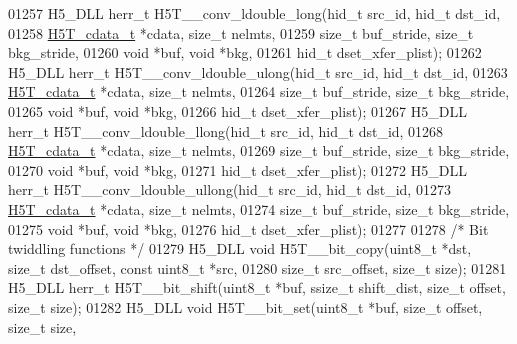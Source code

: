 \begin{DoxyCode}
01257 H5\_DLL herr\_t H5T\_\_conv\_ldouble\_long(hid\_t src\_id, hid\_t dst\_id,
01258                      \hyperlink{struct_h5_t__cdata__t}{H5T\_cdata\_t} *cdata, \textcolor{keywordtype}{size\_t} nelmts,
01259                      \textcolor{keywordtype}{size\_t} buf\_stride, \textcolor{keywordtype}{size\_t} bkg\_stride,
01260                                      \textcolor{keywordtype}{void} *buf, \textcolor{keywordtype}{void} *bkg,
01261                                      hid\_t dset\_xfer\_plist);
01262 H5\_DLL herr\_t H5T\_\_conv\_ldouble\_ulong(hid\_t src\_id, hid\_t dst\_id,
01263                      \hyperlink{struct_h5_t__cdata__t}{H5T\_cdata\_t} *cdata, \textcolor{keywordtype}{size\_t} nelmts,
01264                      \textcolor{keywordtype}{size\_t} buf\_stride, \textcolor{keywordtype}{size\_t} bkg\_stride,
01265                                      \textcolor{keywordtype}{void} *buf, \textcolor{keywordtype}{void} *bkg,
01266                                      hid\_t dset\_xfer\_plist);
01267 H5\_DLL herr\_t H5T\_\_conv\_ldouble\_llong(hid\_t src\_id, hid\_t dst\_id,
01268                      \hyperlink{struct_h5_t__cdata__t}{H5T\_cdata\_t} *cdata, \textcolor{keywordtype}{size\_t} nelmts,
01269                      \textcolor{keywordtype}{size\_t} buf\_stride, \textcolor{keywordtype}{size\_t} bkg\_stride,
01270                                      \textcolor{keywordtype}{void} *buf, \textcolor{keywordtype}{void} *bkg,
01271                                      hid\_t dset\_xfer\_plist);
01272 H5\_DLL herr\_t H5T\_\_conv\_ldouble\_ullong(hid\_t src\_id, hid\_t dst\_id,
01273                      \hyperlink{struct_h5_t__cdata__t}{H5T\_cdata\_t} *cdata, \textcolor{keywordtype}{size\_t} nelmts,
01274                      \textcolor{keywordtype}{size\_t} buf\_stride, \textcolor{keywordtype}{size\_t} bkg\_stride,
01275                                      \textcolor{keywordtype}{void} *buf, \textcolor{keywordtype}{void} *bkg,
01276                                      hid\_t dset\_xfer\_plist);
01277 
01278 \textcolor{comment}{/* Bit twiddling functions */}
01279 H5\_DLL \textcolor{keywordtype}{void} H5T\_\_bit\_copy(uint8\_t *dst, \textcolor{keywordtype}{size\_t} dst\_offset, \textcolor{keyword}{const} uint8\_t *src,
01280               \textcolor{keywordtype}{size\_t} src\_offset, \textcolor{keywordtype}{size\_t} size);
01281 H5\_DLL herr\_t H5T\_\_bit\_shift(uint8\_t *buf, ssize\_t shift\_dist, \textcolor{keywordtype}{size\_t} offset, \textcolor{keywordtype}{size\_t} size);
01282 H5\_DLL \textcolor{keywordtype}{void} H5T\_\_bit\_set(uint8\_t *buf, \textcolor{keywordtype}{size\_t} offset, \textcolor{keywordtype}{size\_t} size,

\end{DoxyCode}
